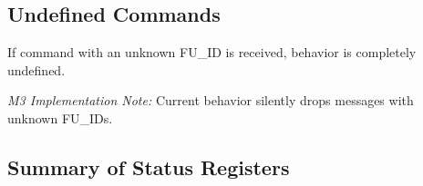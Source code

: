 \subsection{Undefined Commands}
\label{cmd:undef}
If command with an unknown FU\_ID is received, \proto behavior is completely
undefined.

\medskip
\noindent
\emph{M3 Implementation Note:} Current behavior silently drops messages with
unknown FU\_IDs.

\newpage
\subsection{Summary of Status Registers}
\label{cmd:status-register-summary}

\recordRegWrite

\recordRegRead

\recordMemBulkWrite

\recordMemRead

\recordMemStreamWrite

\recordSnoop

